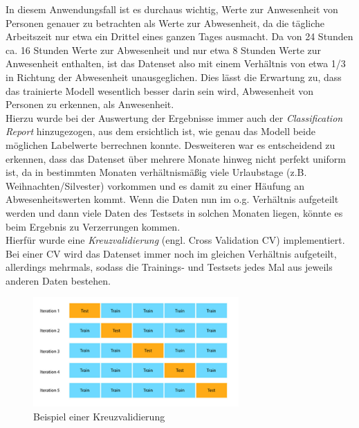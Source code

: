 \vspace{0.75cm}
In diesem Anwendungsfall ist es durchaus wichtig, Werte zur Anwesenheit von Personen genauer zu betrachten als 
Werte zur Abwesenheit, da die tägliche Arbeitszeit nur etwa ein Drittel eines ganzen Tages ausmacht. 
Da von 24 Stunden ca. 16 Stunden Werte zur Abwesenheit und nur etwa 8 Stunden Werte zur Anwesenheit enthalten, 
ist das Datenset also mit einem Verhältnis von etwa 1/3 in Richtung der Abwesenheit unausgeglichen. 
Dies lässt die Erwartung zu, dass das trainierte Modell wesentlich besser darin sein wird, Abwesenheit von Personen
zu erkennen, als Anwesenheit.\\
Hierzu wurde bei der Auswertung der Ergebnisse immer auch der \textit{Classification Report} hinzugezogen,
aus dem ersichtlich ist, wie genau das Modell beide möglichen Labelwerte berrechnen konnte.
\newpage
Desweiteren war es entscheidend zu erkennen, dass das Datenset über mehrere Monate hinweg nicht perfekt uniform 
ist, da in bestimmten Monaten verhältnismäßig viele Urlaubstage (z.B. Weihnachten/Silvester) vorkommen und es damit 
zu einer Häufung an Abwesenheitswerten kommt.
Wenn die Daten nun im o.g. Verhältnis aufgeteilt werden und dann viele Daten des Testsets in solchen Monaten 
liegen, könnte es beim Ergebnis zu Verzerrungen kommen.\\
Hierfür wurde eine \textit{Kreuzvalidierung} (engl. Cross Validation CV) implementiert. Bei einer CV wird das 
Datenset immer noch im gleichen Verhältnis aufgeteilt, allerdings mehrmals, sodass die Trainings- und Testsets 
jedes Mal aus jeweils anderen Daten bestehen.

\begin{figure}[h]
    \centering
    \includegraphics[width=0.7\textwidth]{pic/CV.png}
    \caption{Beispiel einer Kreuzvalidierung}
    \label{fig:CV}
\end{figure}

